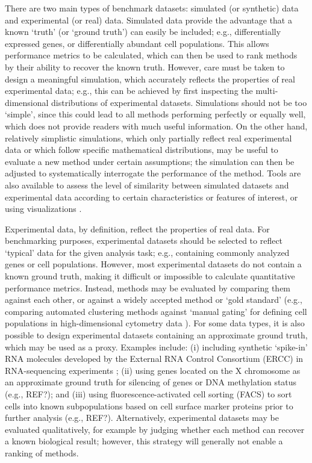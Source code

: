 \documentclass[12pt, a4paper]{article}
\begin{document}
There are two main types of benchmark datasets: simulated (or synthetic) data and experimental (or real) data. Simulated data provide the advantage that a known `truth' (or `ground truth') can easily be included; e.g., differentially expressed genes, or differentially abundant cell populations. This allows performance metrics to be calculated, which can then be used to rank methods by their ability to recover the known truth. However, care must be taken to design a meaningful simulation, which accurately reflects the properties of real experimental data; e.g., this can be achieved by first inspecting the multi-dimensional distributions of experimental datasets. Simulations should not be too `simple', since this could lead to all methods performing perfectly or equally well, which does not provide readers with much useful information. On the other hand, relatively simplistic simulations, which only partially reflect real experimental data or which follow specific mathematical distributions, may be useful to evaluate a new method under certain assumptions; the simulation can then be adjusted to systematically interrogate the performance of the method. Tools are also available to assess the level of similarity between simulated datasets and experimental data according to certain characteristics or features of interest, or using visualizations \citep{Soneson2017}.

Experimental data, by definition, reflect the properties of real data. For benchmarking purposes, experimental datasets should be selected to reflect `typical' data for the given analysis task; e.g., containing commonly analyzed genes or cell populations. However, most experimental datasets do not contain a known ground truth, making it difficult or impossible to calculate quantitative performance metrics. Instead, methods may be evaluated by comparing them against each other, or against a widely accepted method or `gold standard' (e.g., comparing automated clustering methods against `manual gating' for defining cell populations in high-dimensional cytometry data \citep{Weber2016, Aghaeepour2013}). For some data types, it is also possible to design experimental datasets containing an approximate ground truth, which may be used as a proxy. Examples include: (i) including synthetic `spike-in' RNA molecules developed by the External RNA Control Consortium (ERCC) in RNA-sequencing experiments \citep{Jiang2011}; (ii) using genes located on the X chromosome as an approximate ground truth for silencing of genes or DNA methylation status (e.g., REF?); and (iii) using fluorescence-activated cell sorting (FACS) to sort cells into known subpopulations based on cell surface marker proteins prior to further analysis (e.g., REF?). Alternatively, experimental datasets may be evaluated qualitatively, for example by judging whether each method can recover a known biological result; however, this strategy will generally not enable a ranking of methods.
\end{document}
